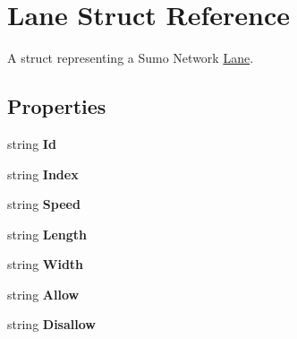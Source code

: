 \hypertarget{struct_lane}{}\section{Lane Struct Reference}
\label{struct_lane}


A struct representing a Sumo Network \mbox{\hyperlink{struct_lane}{Lane}}.  


\subsection*{Properties}
\begin{DoxyCompactItemize}
\item 
\mbox{\label{struct_lane_acbdc5958cd211b068b8224ae061f97e2}} 
string {\bfseries Id}
\item 
\mbox{\label{struct_lane_acddc0106ab6d4a87667f22d10e730b24}} 
string {\bfseries Index}
\item 
\mbox{\label{struct_lane_a4375dbdaa87f046849dee7a17613f06a}} 
string {\bfseries Speed}
\item 
\mbox{\label{struct_lane_ad110d82fdf4ae25a68d0455a7f7e5a6a}} 
string {\bfseries Length}
\item 
\mbox{\label{struct_lane_a0115df56f933800acad86a08ad5d844c}} 
string {\bfseries Width}
\item 
\mbox{\label{struct_lane_ab19a5c96f899b49f87d1eff3135c0adc}} 
string {\bfseries Allow}
\item 
\mbox{\label{struct_lane_abfc5ae609a31c334e79084078accc5bb}} 
string {\bfseries Disallow}

\end{DoxyCompactItemize}
